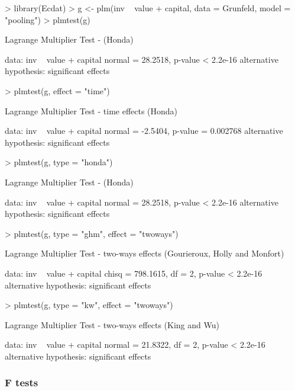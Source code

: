 \documentclass[a4paper]{article}
\begin{document}
\begin{Schunk}
\begin{Sinput}
> library(Ecdat)
> g <- plm(inv ~ value + capital, data = Grunfeld, model = "pooling")
> plmtest(g)
\end{Sinput}
\begin{Soutput}
	Lagrange Multiplier Test - (Honda)

data:  inv ~ value + capital 
normal = 28.2518, p-value < 2.2e-16
alternative hypothesis: significant effects 
\end{Soutput}
\begin{Sinput}
> plmtest(g, effect = "time")
\end{Sinput}
\begin{Soutput}
	Lagrange Multiplier Test - time effects (Honda)

data:  inv ~ value + capital 
normal = -2.5404, p-value = 0.002768
alternative hypothesis: significant effects 
\end{Soutput}
\begin{Sinput}
> plmtest(g, type = "honda")
\end{Sinput}
\begin{Soutput}
	Lagrange Multiplier Test - (Honda)

data:  inv ~ value + capital 
normal = 28.2518, p-value < 2.2e-16
alternative hypothesis: significant effects 
\end{Soutput}
\begin{Sinput}
> plmtest(g, type = "ghm", effect = "twoways")
\end{Sinput}
\begin{Soutput}
	Lagrange Multiplier Test - two-ways effects (Gourieroux, Holly and
	Monfort)

data:  inv ~ value + capital 
chisq = 798.1615, df = 2, p-value < 2.2e-16
alternative hypothesis: significant effects 
\end{Soutput}
\begin{Sinput}
> plmtest(g, type = "kw", effect = "twoways")
\end{Sinput}
\begin{Soutput}
	Lagrange Multiplier Test - two-ways effects (King and Wu)

data:  inv ~ value + capital 
normal = 21.8322, df = 2, p-value < 2.2e-16
alternative hypothesis: significant effects 
\end{Soutput}
\end{Schunk}

\subsubsection{F tests}
\end{document}
